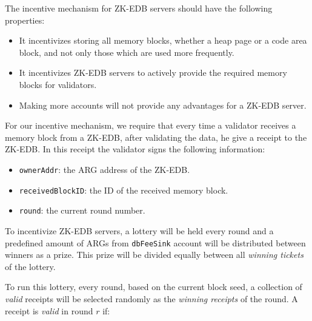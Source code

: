 The incentive mechanism for ZK-EDB servers should have the following properties:

\begin{itemize}
    \item It incentivizes storing all memory blocks, whether a heap page or a code area block, and not only those
    which are used more frequently.
    \item It incentivizes ZK-EDB servers to actively provide the required memory blocks for validators.
    \item Making more accounts will not provide any advantages for a ZK-EDB server.
\end{itemize}

For our incentive mechanism, we require that every time a validator receives a memory block from a ZK-EDB, after
validating the data, he give a receipt to the ZK-EDB. In this receipt the validator signs the following information:

\begin{itemize}
    \item \texttt{ownerAddr}: the ARG address of the ZK-EDB\@.
    \item \texttt{receivedBlockID}: the ID of the received memory block.
    \item \texttt{round}: the current round number.
\end{itemize}


To incentivize ZK-EDB servers, a lottery will be held every round and a predefined amount of ARGs from
\texttt{dbFeeSink} account will be distributed between winners as a prize. This prize will be divided equally
between all \emph{winning tickets} of the lottery.


To run this lottery, every round, based on the current block seed, a collection of \emph{valid} receipts will be
selected randomly as the \emph{winning receipts} of the round. A receipt is \emph{valid} in round $r$ if:

